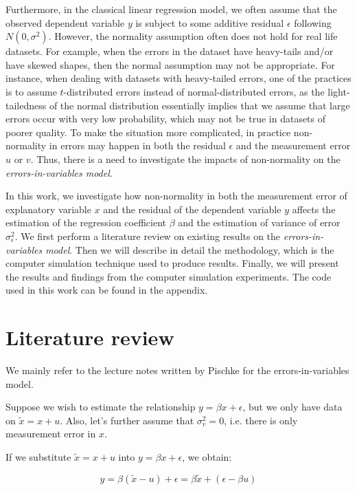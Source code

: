 \documentclass{article}
\begin{document}
Furthermore, in the classical linear regression model, we often assume that the observed dependent variable $y$ is subject to some additive residual $\epsilon$ following $N(0, \sigma^2)$.
However, the normality assumption often does not hold for real life datasets.
For example, when the errors in the dataset have heavy-tails and/or have skewed shapes, then the normal assumption may not be appropriate.
For instance, when dealing with datasets with heavy-tailed errors, one of the practices is to assume $t$-distributed errors instead of normal-distributed errors,
as the light-tailedness of the normal distribution essentially implies that we assume that large errors occur with very low probability, which may not be true in datasets of poorer quality.
To make the situation more complicated, in practice non-normality in errors may happen in both the residual $\epsilon$ and the measurement error $u$ or $v$.
Thus, there is a need to investigate the impacts of non-normality on the \textit{errors-in-variables model}. 

In this work, we investigate how non-normality in both the measurement error of explanatory variable $x$ and the residual of the dependent variable $y$ affects the estimation of the regression coefficient $\beta$ and the estimation of variance of error $\sigma^2_\epsilon$.
We first perform a literature review on existing results on the \textit{errors-in-variables model}.
Then we will describe in detail the methodology, which is the computer simulation technique used to produce results.
Finally, we will present the results and findings from the computer simulation experiments.
The code used in this work can be found in the appendix.

\section{Literature review}

We mainly refer to the lecture notes written by Pischke \cite{lecturenotes} for the errors-in-variables model. 

Suppose we wish to estimate the relationship $y = \beta x + \epsilon$, but we only have data on $\tilde{x} = x + u$. Also, let's further assume that $\sigma_v^2 = 0$, i.e. there is only measurement error in $x$.

If we substitute $\tilde{x} = x+u$ into $y = \beta x + \epsilon$, we obtain:

\begin{equation}
    y = \beta(\tilde{x} - u) + \epsilon = \beta \tilde{x} + (\epsilon - \beta u)
\end{equation}
\end{document}
